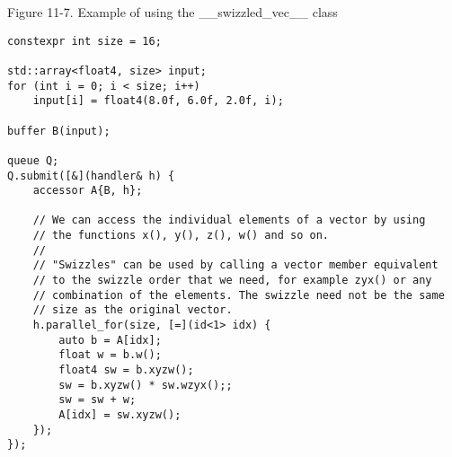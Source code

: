 \hspace*{\fill} \par %
Figure 11-7. Example of using the \_\_swizzled\_vec\_\_ class
\begin{lstlisting}[caption={}]
constexpr int size = 16;

std::array<float4, size> input;
for (int i = 0; i < size; i++)
	input[i] = float4(8.0f, 6.0f, 2.0f, i);

buffer B(input);

queue Q;
Q.submit([&](handler& h) {
	accessor A{B, h};
	
	// We can access the individual elements of a vector by using 
	// the functions x(), y(), z(), w() and so on.
	//
	// "Swizzles" can be used by calling a vector member equivalent
	// to the swizzle order that we need, for example zyx() or any
	// combination of the elements. The swizzle need not be the same
	// size as the original vector.
	h.parallel_for(size, [=](id<1> idx) {
		auto b = A[idx];
		float w = b.w();
		float4 sw = b.xyzw();
		sw = b.xyzw() * sw.wzyx();;
		sw = sw + w;
		A[idx] = sw.xyzw();
	});
});
\end{lstlisting}
































